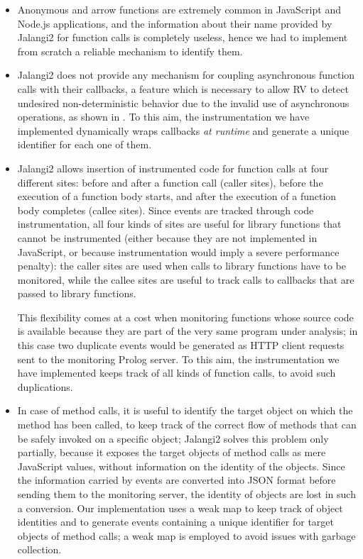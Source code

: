 \begin{itemize}
\item Anonymous and arrow functions are extremely common in JavaScript and Node.js applications, and the information about their name
  provided by Jalangi2 for function calls is completely  useless, hence we had to implement from scratch a reliable mechanism to identify them.
\item Jalangi2 does not provide any mechanism for coupling asynchronous function calls with their callbacks, a feature which is
  necessary to allow RV to detect undesired non-deterministic behavior due to the invalid use of asynchronous operations, as shown in
  . %
To this aim, the instrumentation we have implemented dynamically wraps callbacks \emph{at runtime} and generate a unique identifier for each one of them.
\item Jalangi2 allows insertion of instrumented code for function calls at four different sites: before and after a function call (caller sites), 
  before the execution of a function body starts, and after the execution of a function body completes (callee sites). Since
  events are tracked through code instrumentation, all four kinds of sites are useful for library functions that cannot be
  instrumented (either because they are not implemented in JavaScript, or because instrumentation would imply a severe performance penalty):  the caller sites
  are used when calls to library functions have to be monitored, while the callee sites are useful to track calls to callbacks that are passed to
  library functions.

  This flexibility comes at a cost when monitoring functions whose source code is available because they are part of the very same program under analysis; in this case two duplicate events would be generated as HTTP client requests sent to the monitoring Prolog server. To this aim,
  the instrumentation we have implemented keeps track of all kinds of function calls, to avoid such duplications.
  
\item In case of method calls, it is useful to identify the target object on which the method has been called, to keep track of the correct
  flow of methods that can be safely invoked on a specific object; Jalangi2 solves this problem only partially,
  because it exposes  the target objects of method calls as mere JavaScript values, without information on the identity of the objects.
  Since the information carried by events are converted into JSON format before sending them to the monitoring server, the identity of objects are lost 
  in such a conversion. Our implementation uses a weak map to keep track of object identities and to generate events containing a unique identifier
  for target objects of method calls; a weak map is employed to avoid issues with garbage collection.


\end{itemize}
